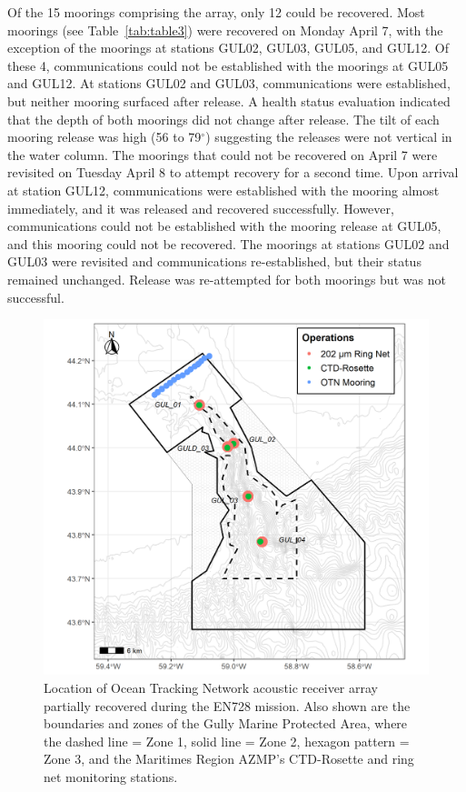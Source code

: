 \documentclass[12pt]{article}\usepackage[]{graphicx}\usepackage[]{color}
\begin{document}
Of the 15 moorings comprising the array, only 12 could be recovered. Most moorings (see Table~\ref{tab:table3}) were recovered on Monday April 7, with the exception of the moorings at stations GUL02, GUL03, GUL05, and GUL12. Of these 4, communications could not be established with the moorings at GUL05 and GUL12. At stations GUL02 and GUL03, communications were established, but neither mooring surfaced after release. A health status evaluation indicated that the depth of both moorings did not change after release. The tilt of each mooring release was high (56 to 79\(^\circ\)) suggesting the releases were not vertical in the water column. The moorings that could not be recovered on April 7 were revisited on Tuesday April 8 to attempt recovery for a second time. Upon arrival at station GUL12, communications were established with the mooring almost immediately, and it was released and recovered successfully. However, communications could not be established with the mooring release at GUL05, and this mooring could not be recovered. The moorings at stations GUL02 and GUL03 were revisited and communications re-established, but their status remained unchanged. Release was re-attempted for both moorings but was not successful.

\clearpage
\begin{figure}[htb]

{\centering \includegraphics{knitr-figs-pdf/figure7-1} 

}

\caption{Location of Ocean Tracking Network acoustic receiver array partially recovered during the EN728 mission. Also shown are the boundaries and zones of the Gully Marine Protected Area, where the dashed line = Zone 1, solid line = Zone 2, hexagon pattern = Zone 3, and the Maritimes Region AZMP's CTD-Rosette and ring net monitoring stations.}\label{fig:figure7}
\end{figure}
\clearpage
\end{document}
